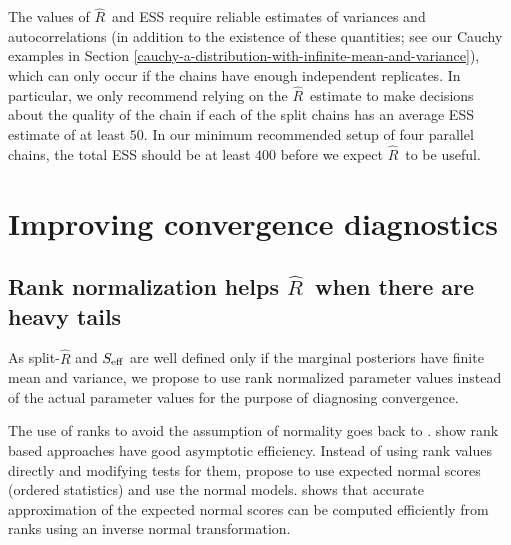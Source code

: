 \documentclass[american,]{article}
\newcommand{\Rhat}{$\widehat{R}$}
\theoremstyle{definition}
\begin{document}

The values of \Rhat\ and ESS require reliable estimates of variances and autocorrelations
(in addition to the existence of these quantities; see our Cauchy examples in Section 
\ref{cauchy-a-distribution-with-infinite-mean-and-variance}), which can
only occur if the chains have enough independent replicates. In particular, we only recommend 
relying on the \Rhat\ estimate to make decisions about the quality of the chain if each of the 
split chains has an average ESS estimate of at least $50$. In our minimum recommended setup of four
parallel chains, the total ESS should be at least $400$ before we expect  \Rhat\ to be useful.


\hypertarget{improving-convergence-diagnostics}{%
\section{Improving convergence
diagnostics}\label{improving-convergence-diagnostics}}

\hypertarget{rank-normalization}{%
\subsection{Rank normalization helps  \Rhat\ when there are heavy tails}\label{rank-normalization}}

As split-\(\widehat{R}\) and \(S_{\rm eff}\) are well defined
only if the marginal posteriors have finite mean and variance, we
propose to use rank normalized parameter values instead of the actual
parameter values for the purpose of diagnosing convergence.

The use of ranks to avoid the assumption of normality goes back to
\citet{Friedman:1937}. \citet{Chernoff+Savage:1958} show rank based
approaches have good asymptotic efficiency. Instead of using rank
values directly and modifying tests for them,
\citet{Fisher+Yates:1938} propose to use expected normal scores
(ordered statistics) and use the normal models. \citet{Blom:1958}
shows that accurate approximation of the expected normal scores can
be computed efficiently from ranks using an inverse normal transformation.
\end{document}
